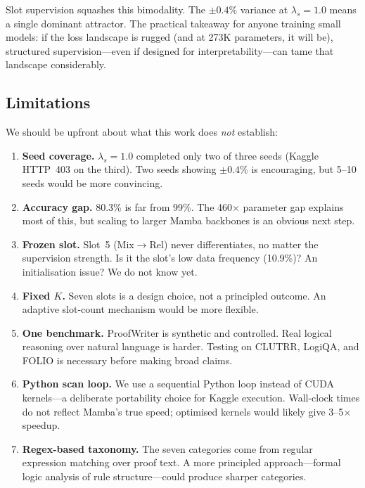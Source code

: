 \documentclass[conference]{IEEEtran}
\begin{document}
Slot supervision squashes this bimodality. The $\pm 0.4\%$
variance at $\lambda_s{=}1.0$ means a single dominant attractor.
The practical takeaway for anyone training small models: if the
loss landscape is rugged (and at 273K parameters, it will be),
structured supervision---even if designed for interpretability---can
tame that landscape considerably.

\subsection{Limitations}
\label{sec:limitations}

We should be upfront about what this work does \emph{not} establish:

\begin{enumerate}[nosep]
    \item \textbf{Seed coverage.}  $\lambda_s{=}1.0$ completed
          only two of three seeds (Kaggle HTTP~403 on the third).
          Two seeds showing $\pm 0.4\%$ is encouraging, but
          5--10 seeds would be more convincing.

    \item \textbf{Accuracy gap.}  80.3\% is far from 99\%.
          The 460$\times$ parameter gap explains most of this, but
          scaling to larger Mamba backbones is an obvious next step.

    \item \textbf{Frozen slot.}  Slot~5 (Mix$\to$Rel) never
          differentiates, no matter the supervision strength.
          Is it the slot's low data frequency (10.9\%)? An
          initialisation issue? We do not know yet.

    \item \textbf{Fixed $K$.}  Seven slots is a design choice, not
          a principled outcome. An adaptive slot-count mechanism
          would be more flexible.

    \item \textbf{One benchmark.}  ProofWriter is synthetic and
          controlled. Real logical reasoning over natural language
          is harder. Testing on CLUTRR, LogiQA, and FOLIO is
          necessary before making broad claims.

    \item \textbf{Python scan loop.}  We use a sequential Python
          loop instead of CUDA kernels---a deliberate portability
          choice for Kaggle execution. Wall-clock times do not
          reflect Mamba's true speed; optimised kernels would
          likely give 3--5$\times$ speedup.

    \item \textbf{Regex-based taxonomy.}  The seven categories
          come from regular expression matching over proof text.
          A more principled approach---formal logic analysis of
          rule structure---could produce sharper categories.
\end{enumerate}
\end{document}
